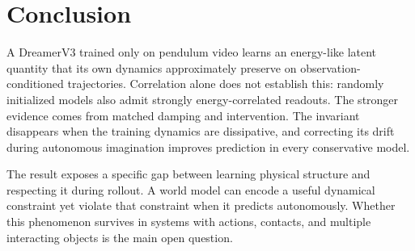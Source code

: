 \section{Conclusion}

A DreamerV3 trained only on pendulum video learns an energy-like latent quantity that its own
dynamics approximately preserve on observation-conditioned trajectories. Correlation alone does not
establish this: randomly initialized models also admit strongly energy-correlated readouts. The
stronger evidence comes from matched damping and intervention. The invariant disappears when the
training dynamics are dissipative, and correcting its drift during autonomous imagination improves
prediction in every conservative model.

The result exposes a specific gap between learning physical structure and respecting it during
rollout. A world model can encode a useful dynamical constraint yet violate that constraint when it
predicts autonomously. Whether this phenomenon survives in systems with actions, contacts, and
multiple interacting objects is the main open question.
